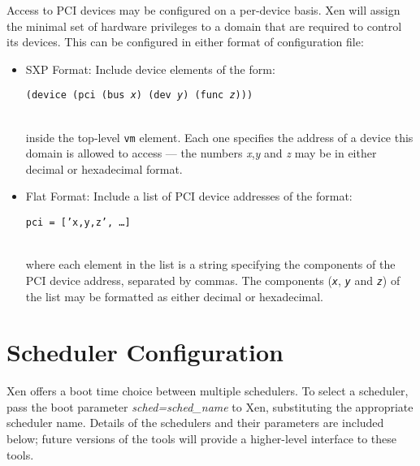Access to PCI devices may be configured on a per-device basis.  Xen
will assign the minimal set of hardware privileges to a domain that
are required to control its devices.  This can be configured in either
format of configuration file:

\begin{itemize}
\item SXP Format: Include device elements of the form: \\
  \centerline{  {\tt (device (pci (bus {\em x}) (dev {\em y}) (func {\em z})))}} \\
  inside the top-level {\tt vm} element.  Each one specifies the
  address of a device this domain is allowed to access --- the numbers
  \emph{x},\emph{y} and \emph{z} may be in either decimal or
  hexadecimal format.
\item Flat Format: Include a list of PCI device addresses of the
  format: \\
  \centerline{{\tt pci = ['x,y,z', \ldots]}} \\
  where each element in the list is a string specifying the components
  of the PCI device address, separated by commas.  The components
  ({\tt \em x}, {\tt \em y} and {\tt \em z}) of the list may be
  formatted as either decimal or hexadecimal.
\end{itemize}





\section{Scheduler Configuration}
\label{s:sched}

Xen offers a boot time choice between multiple schedulers.  To select
a scheduler, pass the boot parameter \emph{sched=sched\_name} to Xen,
substituting the appropriate scheduler name.  Details of the
schedulers and their parameters are included below; future versions of
the tools will provide a higher-level interface to these tools.

